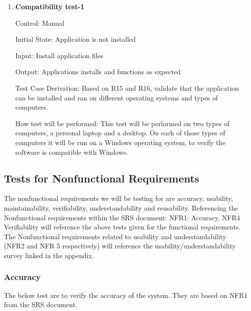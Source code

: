 \documentclass[12pt, titlepage]{article}
\begin{document}
  \begin{enumerate}
    \item {} \hypertarget{Compatibility test-1}{\textbf{Compatibility test-1}} \label{Compatability test-1}
  
  Control: Manual
            
  Initial State: Application is not installed
            
  Input: Install application files
            
  Output: Applications installs and functions as expected
  
  Test Case Derivation: Based on R15 and R16, validate that the application can be installed and ran on different operating systems and types of computers. 
  
  How test will be performed: This test will be performed on two types of computers, a personal laptop and a desktop. On each of those types of computers it will be run on a Windows operating system, to verify the software is compatible with Windows.

  \end{enumerate}

\subsection{Tests for Nonfunctional Requirements}

\noindent The nonfunctional requirements we will be testing for are accuracy, usability, maintainability, verifiability, understandability and reusability. 
Referencing the Nonfunctional requirements within the SRS document: NFR1: Accuracy, NFR4 Verifiability will reference the above tests given for the functional requirements. 
The Nonfunctional requirements related to usability and understandability (NFR2 and NFR 5 respectively) will reference the usability/understandability survey linked in the appendix.

\subsubsection{Accuracy}

The below test are to verify the accuracy of the system.
They are based on NFR1 from the SRS document.
\end{document}
